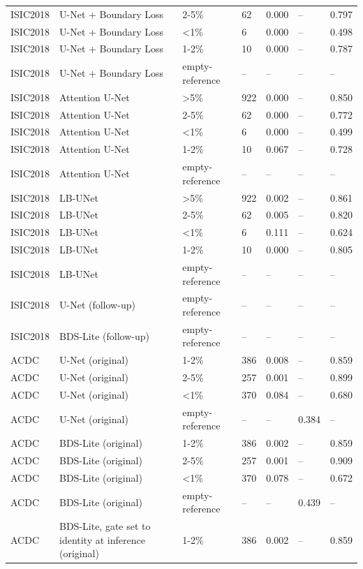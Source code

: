 \begin{longtable}{lllllll}
ISIC2018 & U-Net + Boundary Loss & 2-5\% & 62 & 0.000 & -- & 0.797 \\
ISIC2018 & U-Net + Boundary Loss & <1\% & 6 & 0.000 & -- & 0.498 \\
ISIC2018 & U-Net + Boundary Loss & 1-2\% & 10 & 0.000 & -- & 0.787 \\
ISIC2018 & U-Net + Boundary Loss & empty-reference & -- & -- & -- & -- \\
ISIC2018 & Attention U-Net & >5\% & 922 & 0.000 & -- & 0.850 \\
ISIC2018 & Attention U-Net & 2-5\% & 62 & 0.000 & -- & 0.772 \\
ISIC2018 & Attention U-Net & <1\% & 6 & 0.000 & -- & 0.499 \\
ISIC2018 & Attention U-Net & 1-2\% & 10 & 0.067 & -- & 0.728 \\
ISIC2018 & Attention U-Net & empty-reference & -- & -- & -- & -- \\
ISIC2018 & LB-UNet & >5\% & 922 & 0.002 & -- & 0.861 \\
ISIC2018 & LB-UNet & 2-5\% & 62 & 0.005 & -- & 0.820 \\
ISIC2018 & LB-UNet & <1\% & 6 & 0.111 & -- & 0.624 \\
ISIC2018 & LB-UNet & 1-2\% & 10 & 0.000 & -- & 0.805 \\
ISIC2018 & LB-UNet & empty-reference & -- & -- & -- & -- \\
ISIC2018 & U-Net (follow-up) & empty-reference & -- & -- & -- & -- \\
ISIC2018 & BDS-Lite (follow-up) & empty-reference & -- & -- & -- & -- \\
ACDC & U-Net (original) & 1-2\% & 386 & 0.008 & -- & 0.859 \\
ACDC & U-Net (original) & 2-5\% & 257 & 0.001 & -- & 0.899 \\
ACDC & U-Net (original) & <1\% & 370 & 0.084 & -- & 0.680 \\
ACDC & U-Net (original) & empty-reference & -- & -- & 0.384 & -- \\
ACDC & BDS-Lite (original) & 1-2\% & 386 & 0.002 & -- & 0.859 \\
ACDC & BDS-Lite (original) & 2-5\% & 257 & 0.001 & -- & 0.909 \\
ACDC & BDS-Lite (original) & <1\% & 370 & 0.078 & -- & 0.672 \\
ACDC & BDS-Lite (original) & empty-reference & -- & -- & 0.439 & -- \\
ACDC & BDS-Lite, gate set to identity at inference (original) & 1-2\% & 386 & 0.002 & -- & 0.859 \\

\end{longtable}
